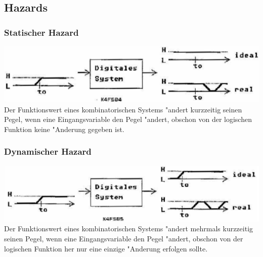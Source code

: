 \subsection{Hazards}
	\begin{minipage}[c]{9 cm}
		\subsubsection{Statischer Hazard}
			\includegraphics[width=1\textwidth]{pics/hazardstatisch}
			Der Funktionswert eines kombinatorischen Systems "andert kurzzeitig seinen Pegel, wenn eine Eingangsvariable den Pegel "andert, obschon von der logischen Funktion keine "Anderung gegeben ist.
	\end{minipage}
	\begin{minipage}[c]{9 cm}	
		\subsubsection{Dynamischer Hazard}
			\includegraphics[width=1\textwidth]{pics/hazarddynamisch}
			Der Funktionswert eines kombinatorischen Systems "andert mehrmals kurzzeitig seinen Pegel, wenn eine Eingangsvariable den Pegel "andert, obschon von der logischen Funktion her nur eine einzige "Anderung erfolgen sollte.
	\end{minipage}
	
